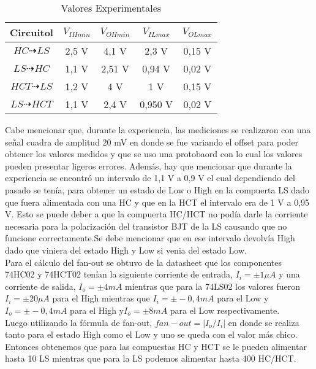 \begin{center}
	\begin{table}[!h]
	\begin{center}
		\caption{Valores Experimentales}
			\begin{tabular}{|c|c|c|c|c|}
				\hline
				\textbf{Circuitol} & \textbf{$V_{IHmin}$} & \textbf{$V_{OHmin}$} & \textbf{$V_{ILmax}$}& \textbf{$V_{OLmax}$}\\
				\hline
				\textbf{$HC \dashrightarrow LS$} & 2,5 V & 4,1 V & 2,3 V & 0,15 V\\
				\hline
				\textbf{$LS \dashrightarrow HC$} & 1,1 V & 2,51 V & 0,94 V & 0,02 V\\
				\hline
				\textbf{$HCT \dashrightarrow LS$} & 1,2 V & 4 V & 1 V & 0,15 V\\
				\hline
				\textbf{$LS \dashrightarrow HCT$} & 1,1 V & 2,4 V & 0,950 V & 0,02 V\\
				\hline
			\end{tabular}
		\end{center}
	\end{table}
\end{center}
\FloatBarrier
Cabe mencionar que, durante la experiencia, las mediciones se realizaron con una señal cuadra de amplitud 20 mV en donde se fue variando el offset para poder obtener los valores medidos y que se uso una protobaord con lo cual los valores pueden presentar ligeros errores. Además, hay que mencionar que durante la experiencia se encontró un intervalo de 1,1 V a 0,9 V el cual dependiendo del pasado se tenía, para obtener un estado de Low o High en la compuerta LS dado que fuera alimentada con una HC y que en la HCT el intervalo era de 1 V a 0,95 V. Esto se puede deber a que la compuerta HC/HCT no podía darle la corriente necesaria para la polarización del transistor BJT de la LS causando que no funcione correctamente.Se debe mencionar que en ese intervalo devolvía High dado que viniera del estado High y Low si venia del estado Low.\\
Para el cálculo del fan-out se obtuvo de la datasheet que los componentes 74HC02 y 74HCT02 tenían la siguiente corriente de entrada, $I_i= \pm 1 \mu A$ y una corriente de salida, $I_o= \pm 4 mA$ mientras que para la 74LS02 los valores fueron $I_i= \pm 20 \mu A$ para el High mientras que $I_i= \pm -0,4 mA$ para el Low y $I_o= \pm -0,4 mA$ para el High y$I_o= \pm 8 mA$ para el Low respectivamente.
\\
Luego utilizando la fórmula de fan-out, $fan-out=|I_o/I_i|$ en donde se realiza tanto para el estado High como el Low y uno se queda con el valor más chico. Entonces obtenemos que para las compuestas HC y HCT se le pueden alimentar hasta 10 LS mientras que para la LS podemos alimentar hasta 400 HC/HCT.\\
